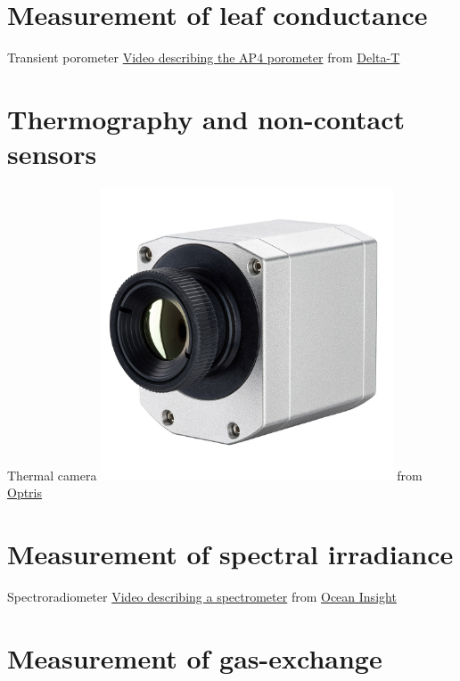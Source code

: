 \documentclass[10pt]{beamer}\usepackage[]{graphicx}\usepackage[]{color}
\begin{document}
\section{Measurement of leaf conductance}

\begin{frame}{Transient porometer}
     \href{https://youtu.be/kA7yS8JJsLE}{Video describing the AP4 porometer} from \href{https://delta-t.co.uk/product/ap4/}{Delta-T}
\end{frame}

\section{Thermography and non-contact sensors}

\begin{frame}{Thermal camera}
 \centering
    \includegraphics[width=0.65\textwidth]{photos/OPTPI4XXi}
     from \href{https://www.optris.co.uk/thermal-imager-optris-pi400-pi450}{Optris}
\end{frame}

\section{Measurement of spectral irradiance}

\begin{frame}{Spectroradiometer}
     \href{https://youtu.be/OI3pIvLhVcc}{Video describing a spectrometer} from \href{https://www.oceaninsight.com/}{Ocean Insight}
\end{frame}

\section{Measurement of gas-exchange}
\end{document}
